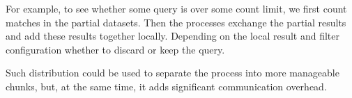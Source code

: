 \begin{figure}[H]
	\scalebox{0.8}{}
\end{figure}

\begin{exmp}
For example, to see whether some query is over some count limit, we first count matches in the partial datasets. Then the processes exchange the partial results and add these results together locally. Depending on the local result and filter configuration whether to discard or keep the query.
\end{exmp}

Such distribution could be used to separate the process into more manageable chunks, but, at the same time, it adds significant communication overhead.
